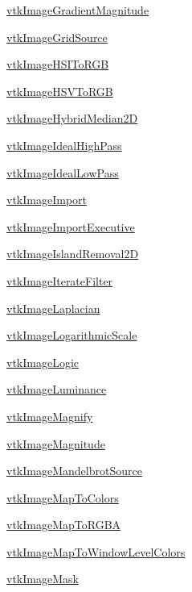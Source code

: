 \begin{DoxyItemize}
\item \hyperlink{vtkimaging_vtkimagegradientmagnitude}{vtk\-Image\-Gradient\-Magnitude}  
\item \hyperlink{vtkimaging_vtkimagegridsource}{vtk\-Image\-Grid\-Source}  
\item \hyperlink{vtkimaging_vtkimagehsitorgb}{vtk\-Image\-H\-S\-I\-To\-R\-G\-B}  
\item \hyperlink{vtkimaging_vtkimagehsvtorgb}{vtk\-Image\-H\-S\-V\-To\-R\-G\-B}  
\item \hyperlink{vtkimaging_vtkimagehybridmedian2d}{vtk\-Image\-Hybrid\-Median2\-D}  
\item \hyperlink{vtkimaging_vtkimageidealhighpass}{vtk\-Image\-Ideal\-High\-Pass}  
\item \hyperlink{vtkimaging_vtkimageideallowpass}{vtk\-Image\-Ideal\-Low\-Pass}  
\item \hyperlink{vtkimaging_vtkimageimport}{vtk\-Image\-Import}  
\item \hyperlink{vtkimaging_vtkimageimportexecutive}{vtk\-Image\-Import\-Executive}  
\item \hyperlink{vtkimaging_vtkimageislandremoval2d}{vtk\-Image\-Island\-Removal2\-D}  
\item \hyperlink{vtkimaging_vtkimageiteratefilter}{vtk\-Image\-Iterate\-Filter}  
\item \hyperlink{vtkimaging_vtkimagelaplacian}{vtk\-Image\-Laplacian}  
\item \hyperlink{vtkimaging_vtkimagelogarithmicscale}{vtk\-Image\-Logarithmic\-Scale}  
\item \hyperlink{vtkimaging_vtkimagelogic}{vtk\-Image\-Logic}  
\item \hyperlink{vtkimaging_vtkimageluminance}{vtk\-Image\-Luminance}  
\item \hyperlink{vtkimaging_vtkimagemagnify}{vtk\-Image\-Magnify}  
\item \hyperlink{vtkimaging_vtkimagemagnitude}{vtk\-Image\-Magnitude}  
\item \hyperlink{vtkimaging_vtkimagemandelbrotsource}{vtk\-Image\-Mandelbrot\-Source}  
\item \hyperlink{vtkimaging_vtkimagemaptocolors}{vtk\-Image\-Map\-To\-Colors}  
\item \hyperlink{vtkimaging_vtkimagemaptorgba}{vtk\-Image\-Map\-To\-R\-G\-B\-A}  
\item \hyperlink{vtkimaging_vtkimagemaptowindowlevelcolors}{vtk\-Image\-Map\-To\-Window\-Level\-Colors}  
\item \hyperlink{vtkimaging_vtkimagemask}{vtk\-Image\-Mask}  

\end{DoxyItemize}
